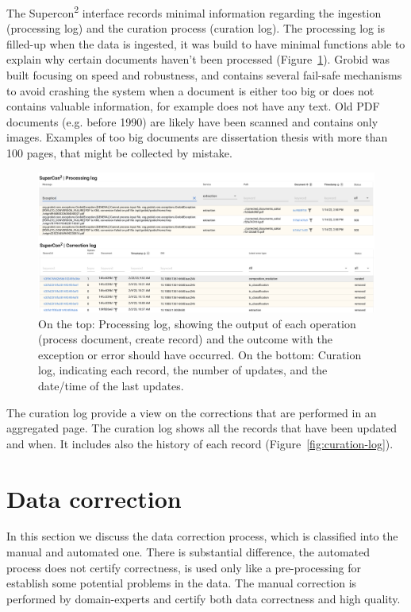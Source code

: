 \documentclass[a4paper]{article}
\begin{document}
The Supercon\textsuperscript{2} interface records minimal information regarding the ingestion (processing log) and the curation process (curation log). 
The processing log is filled-up when the data is ingested, it was build to have minimal functions able to explain why certain documents haven't been processed (Figure~\ref{fig:processing-log}). 
Grobid was built focusing on speed and robustness, and contains several fail-safe mechanisms to avoid crashing the system when a document is either too big or does not contains valuable information, for example does not have any text. Old PDF documents (e.g. before 1990) are likely have been scanned and contains only images. 
Examples of too big documents are dissertation thesis with more than 100 pages, that might be collected by mistake. 


\begin{figure}[ht]
  \centering
  \includegraphics[width=1\textwidth]{images/processing-curation-log.png} 
  \caption{On the top: Processing log, showing the output of each operation (process document, create record) and the outcome with the exception or error should have occurred. On the bottom: Curation log, indicating each record, the number of updates, and the date/time of the last updates.}
  \label{fig:processing-log}
\end{figure}

The curation log provide a view on the corrections that are performed in an aggregated page. 
The curation log shows all the records that have been updated and when. It includes also the history of each record (Figure~\ref{fig:curation-log}).



\section{Data correction}
In this section we discuss the data correction process, which is classified into the manual and automated one. There is substantial difference, the automated process does not certify correctness, is used only like a pre-processing for establish some potential problems in the data. 
The manual correction is performed by domain-experts and certify both data correctness and high quality. 
\end{document}

